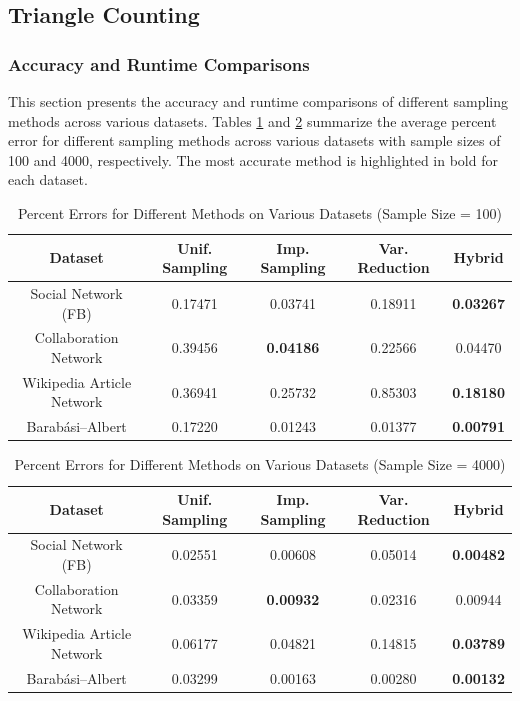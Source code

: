 \documentclass[11pt]{article}
\begin{document}
\subsection{Triangle Counting}

\subsubsection{Accuracy and Runtime Comparisons}

This section presents the accuracy and runtime comparisons of different sampling methods across various datasets.
Tables \ref{tab:percent_error_100} and \ref{tab:percent_error_4000} summarize the average percent error for different sampling methods across various datasets with sample sizes of 100 and 4000, respectively.
The most accurate method is highlighted in bold for each dataset.

\begin{table}[ht]
\centering
\caption{Percent Errors for Different Methods on Various Datasets (Sample Size = 100)}
\label{tab:percent_error_100}
\begin{tabular}{|c|c|c|c|c|}
\hline
\textbf{Dataset} & \textbf{Unif. Sampling} & \textbf{Imp. Sampling} & \textbf{Var. Reduction} & \textbf{Hybrid} \\
\hline
Social Network (FB) & 0.17471 & 0.03741 & 0.18911 & \textbf{0.03267} \\
Collaboration Network & 0.39456 & \textbf{0.04186} & 0.22566 & 0.04470 \\
Wikipedia Article Network & 0.36941 & 0.25732 & 0.85303 & \textbf{0.18180} \\
Barab\'asi--Albert & 0.17220 & 0.01243 & 0.01377 & \textbf{0.00791} \\
\hline
\end{tabular}
\end{table}

\begin{table}[ht]
\centering
\caption{Percent Errors for Different Methods on Various Datasets (Sample Size = 4000)}
\label{tab:percent_error_4000}
\begin{tabular}{|c|c|c|c|c|}
\hline
\textbf{Dataset} & \textbf{Unif. Sampling} & \textbf{Imp. Sampling} & \textbf{Var. Reduction} & \textbf{Hybrid} \\
\hline
Social Network (FB) & 0.02551 & 0.00608 & 0.05014 & \textbf{0.00482} \\
Collaboration Network & 0.03359 & \textbf{0.00932} & 0.02316 & 0.00944 \\
Wikipedia Article Network & 0.06177 & 0.04821 & 0.14815 & \textbf{0.03789} \\
Barab\'asi--Albert & 0.03299 & 0.00163 & 0.00280 & \textbf{0.00132} \\
\hline
\end{tabular}
\end{table}
\end{document}
